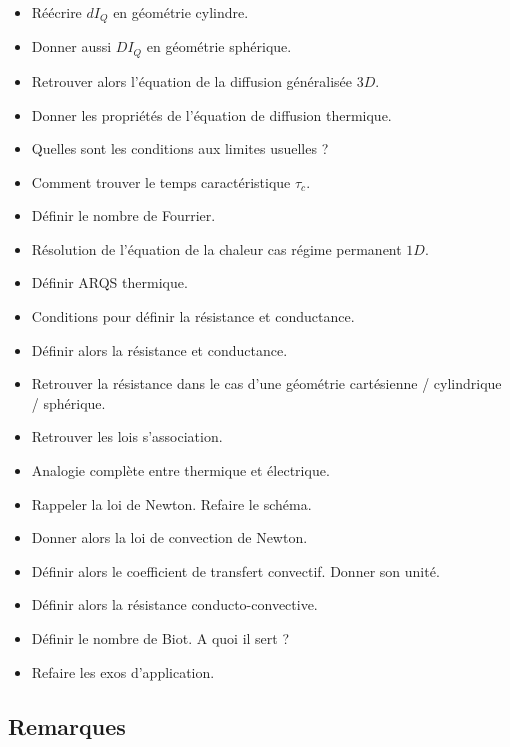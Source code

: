 \documentclass[a4paper, 11pt, hidelinks]{article}
\begin{document}
\begin{itemize}
    \item Réécrire $dI_Q$ en géométrie cylindre. \cite{Chapitre20}
    \item Donner aussi $DI_Q$ en géométrie sphérique. \cite{Chapitre20}
    \item Retrouver alors l'équation de la diffusion généralisée  $3D$. \cite{Chapitre20}
    \item Donner les propriétés de l'équation de diffusion thermique. \cite{Chapitre20}
    \item Quelles sont les conditions aux limites usuelles ? \cite{Chapitre20}
    \item Comment trouver le temps caractéristique $\tau_c$. \cite{Chapitre20}
    \item Définir le nombre de Fourrier. \cite{Chapitre20}
    \item Résolution de l'équation de la chaleur cas régime permanent $1D$. \cite{Chapitre20}
    \item Définir ARQS thermique.\cite{Chapitre20}
    \item Conditions pour définir la résistance et conductance. \cite{Chapitre20}
    \item Définir alors la résistance et conductance. \cite{Chapitre20}
    \item Retrouver la résistance dans le cas d'une géométrie cartésienne / cylindrique / sphérique. \cite{Chapitre20}
    \item Retrouver les lois s'association. \cite{Chapitre20}
    \item Analogie complète entre thermique et électrique. \cite{Chapitre20}
    \item Rappeler la loi de Newton. Refaire le schéma. \cite{Chapitre20}
    \item Donner alors la loi de convection de Newton. \cite{Chapitre20}
    \item Définir alors le coefficient de transfert convectif. Donner son unité. \cite{Chapitre20}
    \item Définir alors la résistance conducto-convective. \cite{Chapitre20}
    \item Définir le nombre de Biot. A quoi il sert ? \cite{Chapitre20}
    \item Refaire les exos d'application. \cite{Chapitre20}
\end{itemize}


\subsection{Remarques}
\end{document}
